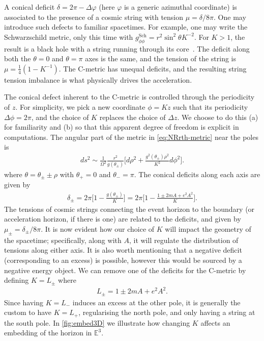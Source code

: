 \documentclass[
twoside,
openright,
frontopenright
]{dmathesis}
\begin{document}
A conical deficit $\delta = 2\pi - \Delta \varphi$ (here $\varphi$ is a generic
azimuthal coordinate) is associated to the presence of a cosmic string with
tension $\mu = \delta/8\pi$. One may introduce such defects to familiar
spacetimes. For example, one may write the Schwarzschild metric, only this time
with $g^{\mathrm{Sch}}_{\phi\phi}= r^2\sin^2\theta K^{-2}$. For $K>1$, the
result is a black hole with a string running through its
core~\cite{Aryal:1986sz}. The deficit along both the $\theta = 0$ and
$\theta= \pi$ axes is the same, and the tension of the string is
$\mu=\frac14(1-K^{-1})$. The C-metric has unequal deficits, and the resulting
string tension imbalance is what physically drives the acceleration.

The conical defect inherent to the C-metric is controlled through the
periodicity of $z$. For simplicity, we pick a new coordinate $\phi = K z$ such
that its periodicity $\Delta\phi=2\pi$, and the choice of $K$ replaces the
choice of $\Delta z$. We choose to do this (a) for familiarity and (b) so that
this apparent degree of freedom is explicit in computations. The angular part of
the metric in \cref{eq:NRrth-metric} near the poles is
\begin{align}
ds^2 \sim \frac{1}{\Omega^2}\frac{r^2}{g(\theta_{\pm})}\bigg[d\rho^2 +
  \frac{g^2(\theta_{\pm}) \rho^{2}}{K^2}d\phi^2\bigg]. 
\end{align}
where $\theta = \theta_{\pm} \pm \rho$ with $\theta_+=0$ and $\theta_-=\pi$. The
conical deficits along each axis are given by 
\begin{align}
  \label{eq:deficitsNR}
  \delta_\pm=2\pi\bigg[1-\frac{g(\theta_\pm)}{K}\bigg] = 2\pi\bigg[1-\frac{1\pm
  2mA + e^2A^2}{K}\bigg]. 
\end{align} 
The tensions of cosmic strings connecting the event horizon to the boundary (or
acceleration horizon, if there is one) are related to the deficits, and given by
$\mu_\pm=\delta_\pm/8\pi$. It is now evident how our choice of $K$ will impact
the geometry of the spacetime; specifically, along with $A$, it will regulate
the distribution of tensions along either axis. It is also worth mentioning that
a negative deficit (corresponding to an excess) is possible, however this would
be sourced by a negative energy object. We can remove one of the deficits for
the C-metric by defining $K=L_\pm$ where
\begin{align}
L_\pm=1\pm 2mA + e^2A^2.
\end{align}
Since having $K=L_-$ induces an excess at the other pole, it is generally the
custom to have $K=L_+$, regularising the north pole, and only having a string at
the south pole. In \cref{fig:embed3D} we illustrate how changing $K$ affects an
embedding of the horizon in $\mathbb{E}^3$. 
\end{document}
